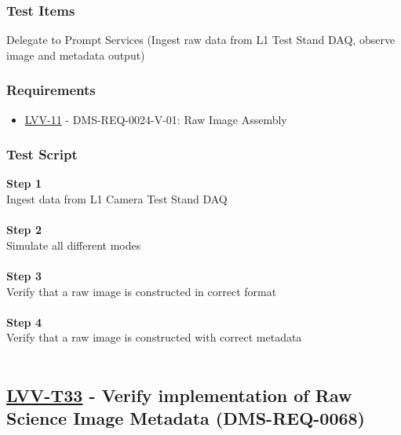 \hypertarget{test-items-8}{%
\subsubsection{Test Items}\label{test-items-8}}

Delegate to Prompt Services (Ingest raw data from L1 Test Stand DAQ,
observe image and metadata output)

\hypertarget{requirements-9}{%
\subsubsection{Requirements}\label{requirements-9}}

\begin{itemize}
\tightlist
\item
  \href{https://jira.lsstcorp.org/browse/LVV-11}{LVV-11} -
  DMS-REQ-0024-V-01: Raw Image Assembly
\end{itemize}

\hypertarget{test-script-9}{%
\subsubsection{Test Script}\label{test-script-9}}

\textbf{Step 1}\\
Ingest data from L1 Camera Test Stand DAQ\\
~\\
\textbf{Step 2}\\
Simulate all different modes\\
~\\
\textbf{Step 3}\\
Verify that a raw image is constructed in correct format\\
~\\
\textbf{Step 4}\\
Verify that a raw image is constructed with correct metadata\\
~\\

\hypertarget{lvv-t33---verify-implementation-of-raw-science-image-metadata-dms-req-0068}{%
\subsection{\texorpdfstring{\href{https://jira.lsstcorp.org/secure/Tests.jspa\#/testCase/LVV-T33}{LVV-T33}
- Verify implementation of Raw Science Image Metadata
(DMS-REQ-0068)}{LVV-T33 - Verify implementation of Raw Science Image Metadata (DMS-REQ-0068)}}\label{lvv-t33---verify-implementation-of-raw-science-image-metadata-dms-req-0068}}

